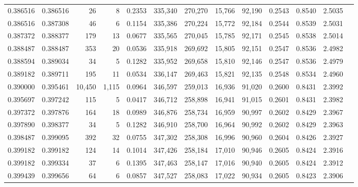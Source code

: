 \begin{tabular}{rrrrrrrrrrrrr}
0.386516 & 0.386516 &     26 &     8 &                                     0.2353 & 335,340 & 270,270 &  15,766 &  92,190 & 0.2543 & 0.8540 & 2.5035 \\
0.386516 & 0.387308 &     46 &     6 &                                     0.1154 & 335,386 & 270,224 &  15,772 &  92,184 & 0.2544 & 0.8539 & 2.5031 \\
0.387372 & 0.388377 &    179 &    13 &                                     0.0677 & 335,565 & 270,045 &  15,785 &  92,171 & 0.2545 & 0.8538 & 2.5014 \\
0.388487 & 0.388487 &    353 &    20 &                                     0.0536 & 335,918 & 269,692 &  15,805 &  92,151 & 0.2547 & 0.8536 & 2.4982 \\
0.388594 & 0.389034 &     34 &     5 &                                     0.1282 & 335,952 & 269,658 &  15,810 &  92,146 & 0.2547 & 0.8536 & 2.4979 \\
0.389182 & 0.389711 &    195 &    11 &                                     0.0534 & 336,147 & 269,463 &  15,821 &  92,135 & 0.2548 & 0.8534 & 2.4960 \\
0.390000 & 0.395461 & 10,450 & 1,115 &                                     0.0964 & 346,597 & 259,013 &  16,936 &  91,020 & 0.2600 & 0.8431 & 2.3992 \\
0.395697 & 0.397242 &    115 &     5 &                                     0.0417 & 346,712 & 258,898 &  16,941 &  91,015 & 0.2601 & 0.8431 & 2.3982 \\
0.397372 & 0.397876 &    164 &    18 &                                     0.0989 & 346,876 & 258,734 &  16,959 &  90,997 & 0.2602 & 0.8429 & 2.3967 \\
0.397890 & 0.398377 &     34 &     5 &                                     0.1282 & 346,910 & 258,700 &  16,964 &  90,992 & 0.2602 & 0.8429 & 2.3963 \\
0.398487 & 0.399095 &    392 &    32 &                                     0.0755 & 347,302 & 258,308 &  16,996 &  90,960 & 0.2604 & 0.8426 & 2.3927 \\
0.399182 & 0.399182 &    124 &    14 &                                     0.1014 & 347,426 & 258,184 &  17,010 &  90,946 & 0.2605 & 0.8424 & 2.3916 \\
0.399182 & 0.399334 &     37 &     6 &                                     0.1395 & 347,463 & 258,147 &  17,016 &  90,940 & 0.2605 & 0.8424 & 2.3912 \\
0.399439 & 0.399656 &     64 &     6 &                                     0.0857 & 347,527 & 258,083 &  17,022 &  90,934 & 0.2605 & 0.8423 & 2.3906 \\

\end{tabular}
